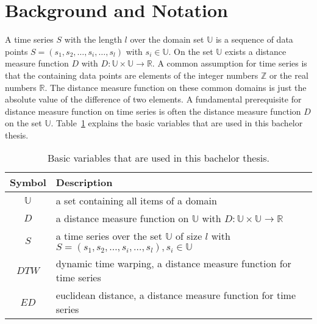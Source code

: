 \section{Background and Notation} \label{background_and_notation}
A time series $S$ with the length $l$ over the domain set $\mathbb{U}$ is a sequence of data points
$S = (s_1, s_2, \dots, s_i, \dots, s_l)$ with $s_i \in \mathbb{U}$. On the set $\mathbb{U}$ exists a distance measure
function $D$ with $D: \mathbb{U} \times \mathbb{U} \to \mathbb{R}$. A common assumption for time series is that the
containing data points are elements of the integer numbers $\mathbb{Z}$ or the real numbers $\mathbb{R}$. The distance
measure function on these common domains is just the absolute value of the difference of two elements. A fundamental
prerequisite for distance measure function on time series is often the distance measure function $D$ on the set
$\mathbb{U}$. Table~\ref{tab:notation} explains the basic variables that are used in this bachelor thesis.

\begin{table}[H]
    \begin{center}
        \begin{tabularx}{\textwidth}{c X}
            \textbf{Symbol} & \textbf{Description}\\
            \hline
            $\mathbb{U}$ & a set containing all items of a domain\\
            $D$ & a distance measure function on $\mathbb{U}$ with $D: \mathbb{U} \times \mathbb{U} \to \mathbb{R}$\\
            $S$ & a time series over the set $\mathbb{U}$ of size $l$ with
                $S = (s_1, s_2, \dots, s_i, \dots, s_l), s_i \in \mathbb{U}$\\
            $DTW$ & dynamic time warping, a distance measure function for time series\\
            $ED$ & euclidean distance, a distance measure function for time series
        \end{tabularx}
    \end{center}
    \caption{Basic variables that are used in this bachelor thesis.}
	\label{tab:notation}
\end{table}




